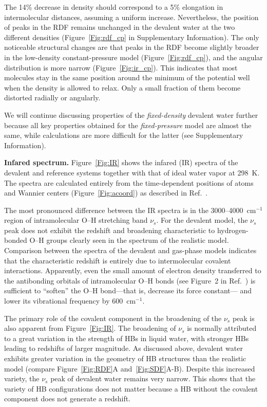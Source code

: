 \documentclass[aps,prl,reprint,amsmath,amssymb]{revtex4-1}
\begin{document}
The 14\% decrease in density should correspond to a 5\% elongation in intermolecular distances, assuming a uniform increase. Nevertheless, the position of peaks in the RDF remains unchanged in the devalent water at the two different densities (Figure~\ref{Fig:rdf_cp} in Supplementary Information). The only noticeable structural changes are that peaks in the RDF become slightly broader in the low-density constant-pressure model (Figure~\ref{Fig:rdf_cp}), and the angular distribution is more narrow (Figure~\ref{Fig:ir_cp}). This indicates that most molecules stay in the same position around the minimum of the potential well when the density is allowed to relax. Only a small fraction of them become distorted radially or angularly. 

We will continue discussing properties of the \emph{fixed-density} devalent water further because all key properties obtained for the \emph{fixed-pressure} model are almost the same, while calculations are more difficult for the latter (see Supplementary Information).


\textbf{Infared spectrum.} Figure~\ref{Fig:IR} shows the infared (IR) spectra of the devalent and reference systems together with that of ideal water vapor at 298~K. The spectra are calculated entirely from the time-dependent positions of atoms and Wannier centers (Figure~\ref{Fig:acoord}) as described in Ref.~.

The most pronounced difference between the IR spectra is in the 3000--4000~cm$^{-1}$ region of intramolecular O--H stretching band $\nu_s$. 
For the devalent model, the $\nu_s$ peak does not exhibit the redshift and broadening characteristic to hydrogen-bonded O--H groups clearly seen in the spectrum of the realistic model. 
Comparison between the spectra of the devalent and gas-phase models indicates that the characteristic redshift is entirely due to intermolecular covalent interactions. 
Apparently, even the small amount of electron density transferred to the antibonding orbitals of intramolecular O--H bonds (see Figure~2 in Ref.~) is sufficient to ``soften'' the O--H bond---that is, decrease its force constant--- and lower its vibrational frequency by 600~cm$^{-1}$.

The primary role of the covalent component in the broadening of the $\nu_s$ peak is also apparent from Figure~\ref{Fig:IR}. 
The broadening of $\nu_s$ is normally attributed to a great variation in the strength of HBs in liquid water, with stronger HBs leading to redshifts of larger magnitude. 
As discussed above, devalent water exhibits greater variation in the geometry of HB structures than the realistic model (compare Figure~\ref{Fig:RDF}A and~\ref{Fig:SDF}A-B). 
Despite this increased variety, the $\nu_s$ peak of devalent water remains very narrow. This shows that the variety of HB configurations does not matter because a HB without the covalent component does not generate a redshift. 
\end{document}
